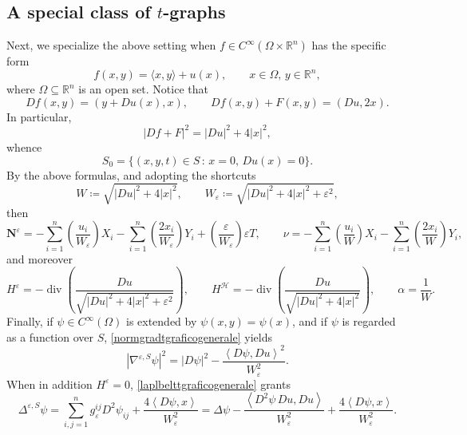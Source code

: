 \documentclass[11pt]{amsart}
\newcommand{\hhh}{{\mathcal{H}}}
\newcommand{\n}[1]{\nabla^\varepsilon_{ #1 }}
\newcommand{\vh}{\nu}
\newcommand{\rr}{{\mathbb{R}}}
\newcommand{\Om}{\Omega}
\newcommand{\eps}{\varepsilon}
\newcommand{\W}{W}
\newcommand{\We}{W_\eps}
\renewcommand{\n}{\mathbf{N}}
\DeclareMathOperator{\divv}{div}
\theoremstyle{definition}
\theoremstyle{remark}
\numberwithin{equation}{section}
\begin{document}
  \subsection{A special class of $t$-graphs} \label{sec_specialclass} Next, we specialize the above setting when $f\in C^\infty(\Om\times\rr^n)$ has the specific form
    \begin{equation*}
        f(x,y)=\langle x,y\rangle+u(x),\qquad x\in\Om,\,y\in\rr^n,
    \end{equation*}
    where $\Om\subseteq\rr^n$ is an open set. Notice that
    \begin{equation}\label{formaspecialecoso2939469}
        Df(x,y)=\left( y+Du(x),x\right),\qquad Df(x,y)+F(x,y)=\left(Du,2x\right).
    \end{equation}
    In particular, 
    $$ |Df+F|^2=|Du|^2+4|x|^2,$$
    whence 
    \begin{equation}\label{carsetforspecialgraf}
        S_0=\{(x,y,t)\in S\,:\,x=0,\,Du(x)=0\}.
    \end{equation}
   By the above formulas, and adopting the shortcuts
    \begin{equation}
    \label{eq:Weps}
      \W\coloneqq \sqrt{|Du|^2+4|x|^2},\qquad  \We\coloneqq \sqrt{|Du|^2+4|x|^2+\eps^2},
    \end{equation}
    then
    \begin{equation}\label{normalipergraficiridotti38586}
    \n^\eps=-\sum_{i=1}^{n}\left(\frac{u_i}{\We}\right)X_i-\sum_{i=1}^{n}\left(\frac{2x_i}{\We}\right)Y_i+\left(\frac{\eps}{\We}\right)\eps T,\qquad
    \vh=-\sum_{i=1}^{n}\left(\frac{u_i}{\W}\right)X_i-\sum_{i=1}^{n}\left(\frac{2x_i}{\W}\right)Y_i,
\end{equation}
and moreover
\begin{equation}\label{espressionecurvaturamediariempergarficispeciali}
     H^\eps=-\divv\left(\frac{Du}{\sqrt{|Du|^2+4|x|^2+\eps^2}}\right),\qquad   H^\hhh=-\divv\left(\frac{Du}{\sqrt{|Du|^2+4|x|^2}}\right),\qquad \alpha=\frac{1}{\W}.
\end{equation}
Finally, if $\psi\in C^\infty(\Om)$ is extended by $\psi(x,y)=\psi(x)$, and if $\psi$ is regarded as a function over $S$, \eqref{normgradtgraficogenerale} yields
\begin{equation}\label{gradientesulgraficopercosenony38486}
    \left|\nabla^{\eps,S}\psi\right|^2=|D\psi|^2-\frac{\left\langle D\psi,Du\right\rangle^2}{\We^2}.
\end{equation}
When in addition $H^\eps=0$, \eqref{laplbelttgraficogenerale} grants
\begin{equation}\label{equazioneperlaplacianograficoridotto38486854}
    \Delta^{\eps,S}\psi=\sum_{i,j=1}^{n}g^{ij}_\eps D^2\psi_{ij}+\frac{4\left\langle D\psi,x\right\rangle}{\We^2}=\Delta\psi-\frac{\left\langle D^2 \psi\,Du,Du\right\rangle}{\We^2}+\frac{4\left\langle D\psi,x\right\rangle}{\We^2}.
\end{equation}
\end{document}
